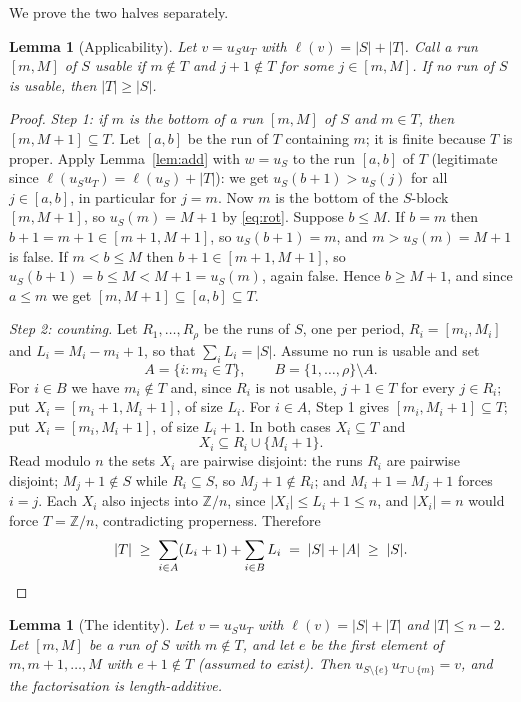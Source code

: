 \documentclass[11pt]{article}
\newtheorem{lem}[thm]{Lemma}
\theoremstyle{definition}
\newcommand{\Z}{\mathbb{Z}}
\begin{document}
We prove the two halves separately.

\begin{lem}[Applicability]\label{lem:apply}
Let $v=u_Su_T$ with $\ell(v)=|S|+|T|$. Call a run $[m,M]$ of $S$ \emph{usable} if $m\notin T$
and $j+1\notin T$ for some $j\in[m,M]$. If no run of $S$ is usable, then $|T|\ge|S|$.
\end{lem}

\begin{proof}
\emph{Step 1: if $m$ is the bottom of a run $[m,M]$ of $S$ and $m\in T$, then
$[m,M+1]\subseteq T$.}
Let $[a,b]$ be the run of $T$ containing $m$; it is finite because $T$ is proper. Apply
Lemma~\ref{lem:add} with $w=u_S$ to the run $[a,b]$ of $T$ (legitimate since
$\ell(u_Su_T)=\ell(u_S)+|T|$): we get $u_S(b+1)>u_S(j)$ for all $j\in[a,b]$, in particular for
$j=m$. Now $m$ is the bottom of the $S$-block $[m,M+1]$, so $u_S(m)=M+1$ by \eqref{eq:rot}.
Suppose $b\le M$. If $b=m$ then $b+1=m+1\in[m+1,M+1]$, so $u_S(b+1)=m$, and
$m>u_S(m)=M+1$ is false. If $m<b\le M$ then $b+1\in[m+1,M+1]$, so $u_S(b+1)=b\le M<M+1=u_S(m)$,
again false. Hence $b\ge M+1$, and since $a\le m$ we get $[m,M+1]\subseteq[a,b]\subseteq T$.

\emph{Step 2: counting.} Let $R_1,\dots,R_\rho$ be the runs of $S$, one per period,
$R_i=[m_i,M_i]$ and $L_i=M_i-m_i+1$, so that $\sum_i L_i=|S|$. Assume no run is usable and set
\[
  A=\{i: m_i\in T\},\qquad B=\{1,\dots,\rho\}\setminus A .
\]
For $i\in B$ we have $m_i\notin T$ and, since $R_i$ is not usable, $j+1\in T$ for every
$j\in R_i$; put $X_i=[m_i+1,M_i+1]$, of size $L_i$. For $i\in A$, Step 1 gives
$[m_i,M_i+1]\subseteq T$; put $X_i=[m_i,M_i+1]$, of size $L_i+1$. In both cases
$X_i\subseteq T$ and
\[
  X_i\subseteq R_i\cup\{M_i+1\}.
\]
Read modulo $n$ the sets $X_i$ are pairwise disjoint: the runs $R_i$ are pairwise disjoint;
$M_j+1\notin S$ while $R_i\subseteq S$, so $M_j+1\notin R_i$; and $M_i+1=M_j+1$ forces $i=j$.
Each $X_i$ also injects into $\Z/n$, since $|X_i|\le L_i+1\le n$, and $|X_i|=n$ would force
$T=\Z/n$, contradicting properness. Therefore
\[
  |T|\;\ge\;\sum_{i\in A}(L_i+1)+\sum_{i\in B}L_i\;=\;|S|+|A|\;\ge\;|S| . \qedhere
\]
\end{proof}

\begin{lem}[The identity]\label{lem:identity}
Let $v=u_Su_T$ with $\ell(v)=|S|+|T|$ and $|T|\le n-2$. Let $[m,M]$ be a run of $S$ with
$m\notin T$, and let $e$ be the first element of $m,m+1,\dots,M$ with $e+1\notin T$ (assumed to
exist). Then $u_{S\setminus\{e\}}\,u_{T\cup\{m\}}=v$, and the factorisation is length-additive.
\end{lem}
\end{document}
